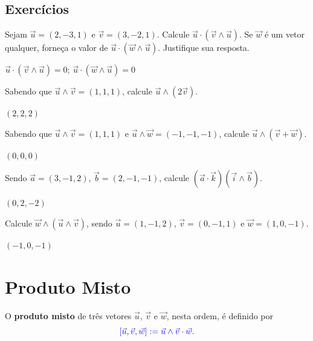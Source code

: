\subsection{Exercícios}

\begin{exer}
  Sejam $\vec{u}=(2,-3,1)$ e $\vec{v}=(3,-2,1)$. Calcule $\vec{u}\cdot(\vec{v}\land\vec{u})$. Se $\vec{w}$ é um vetor qualquer, forneça o valor de $\vec{u}\cdot(\vec{w}\land\vec{u})$. Justifique sua resposta.
\end{exer}
\begin{resp}
  $\vec{u}\cdot(\vec{v}\land\vec{u})=0$; $\vec{u}\cdot(\vec{w}\land\vec{u})=0$
\end{resp}

\begin{exer}
  Sabendo que $\vec{u}\land\vec{v}=(1,1,1)$, calcule $\vec{u}\land(2\vec{v})$.
\end{exer}
\begin{resp}
  $(2,2,2)$
\end{resp}

\begin{exer}
  Sabendo que $\vec{u}\land\vec{v}=(1,1,1)$ e $\vec{u}\land\vec{w}=(-1,-1,-1)$, calcule $\vec{u}\land(\vec{v} + \vec{w})$.
\end{exer}
\begin{resp}
  $(0,0,0)$
\end{resp}

\begin{exer}
  Sendo $\vec{a}=(3,-1,2)$, $\vec{b}=(2,-1,-1)$, calcule $(\vec{a}\cdot\vec{k})(\vec{i}\land\vec{b})$.
\end{exer}
\begin{resp}
  $(0,2,-2)$
\end{resp}

\begin{exer}
  Calcule $\vec{w}\land(\vec{u}\land\vec{v})$, sendo $\vec{u}=(1,-1,2)$, $\vec{v}=(0,-1,1)$ e $\vec{w}=(1,0,-1)$.
\end{exer}
\begin{resp}
  $(-1,0,-1)$
\end{resp}

\section{Produto Misto}\label{cap_prodmisto_sec_defn}
\badgeRevisar

O {\bf produto misto} de três vetores $\vec{u}$, $\vec{v}$ e $\vec{w}$, nesta ordem, é definido por
\begin{equation}
  {\color{blue}[\vec{u},\vec{v},\vec{w}] := \vec{u}\land\vec{v}\cdot\vec{w}}.
\end{equation}

